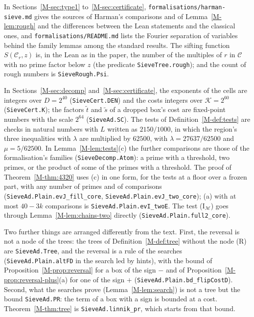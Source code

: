 \documentclass[11pt]{article}
\newcommand{\lean}[1]{\texttt{#1}}
\newcommand{\file}[1]{\nolinkurl{#1}}
\numberwithin{equation}{section}
\begin{document}
\begin{sloppypar}
In Sections~\ref{M-sec:type1} to~\ref{M-sec:certificate}, \file{formalisations/harman-sieve.md} gives the sources of
Harman's comparisons and of Lemma~\ref{M-lem:rough} and the differences between the Lean statements and the classical
ones, and \file{formalisations/README.md} lists the Fourier separation of variables behind the family lemmas among the
standard results. The sifting function $S(\mathcal C_r, z)$ is, in the Lean as in the paper, the number of the
multiples of $r$ in $\mathcal C$ with no prime factor below $z$ (the predicate \lean{SieveTree.rough}); and the count
of rough numbers is \lean{SieveRough.Psi}.

In Sections~\ref{M-sec:decomp} and~\ref{M-sec:certificate}, the exponents of the cells are integers over $D = 2^{40}$
(\lean{SieveCert.DEN}) and the costs integers over $\mathcal K = 2^{60}$ (\lean{SieveCert.K}); the factors $\tilde t$
and $\tilde s$ of a dropped box's cost are fixed-point numbers with the scale $2^{64}$ (\lean{SieveAd.SC}). The tests of
Definition~\ref{M-def:tests} are checks in natural numbers with $L$ written as $2150/1000$, in which the region's three
inequalities with $\lambda$ are multiplied by $62500$, with $\lambda = 27637/62500$ and $\mu = 5/62500$. In
Lemma~\ref{M-lem:tests}(c) the further comparisons are those of the formalisation's families
(\lean{SieveDecomp.Atom}): a prime with a threshold, two primes, or the product of some of the primes with a threshold.
The proof of Theorem~\ref{M-thm:4320} uses (c) in one form, for the tests at a floor over a frozen part, with any
number of primes and of comparisons (\lean{SieveAd.Plain.evJ\_fill\_core}, \lean{SieveAd.Plain.evJ\_two\_core}); (a)
with at most
$40 - 3k$ comparisons is \lean{SieveAd.Plain.evI\_twoE}. The test (I$_{\mathcal M}$) goes through
Lemma~\ref{M-lem:chains-two} directly (\lean{SieveAd.Plain.full2\_core}).

Two further things are arranged differently from the text. First, the reversal is not a node of the trees: the trees of
Definition~\ref{M-def:tree} without the node (R) are \lean{SieveAd.Tree}, and the reversal is a rule of the searches
(\lean{SieveAd.Plain.altFD} in the search led by hints), with the bound of Proposition~\ref{M-prop:reversal} for a box
of the sign $-$ and of Proposition~\ref{M-prop:reversal-plus}(a) for one of the sign $+$
(\lean{SieveAd.Plain.bd\_flipCostD}). Second, what the searches prove (Lemma~\ref{M-lem:search}) is not a tree but the
bound \lean{SieveAd.PR}: the term of a box with a sign is bounded at a cost. Theorem~\ref{M-thm:tree} is
\lean{SieveAd.linnik\_pr}, which starts from that bound.


\end{sloppypar}
\end{document}
